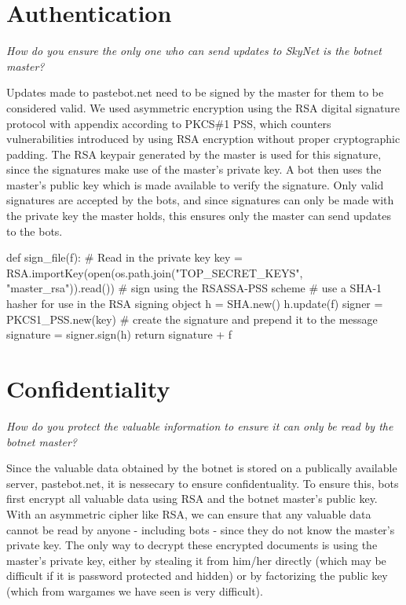 \documentclass[9pt,a4paper]{article}
\begin{document}
\maketitle
\small
\setlength{\parindent}{0pt}

\section{Authentication}
\emph{How do you ensure the only one who can send updates to SkyNet is the botnet master?}

Updates made to pastebot.net need to be signed by the master for them to be considered valid. We used asymmetric encryption using the RSA digital signature protocol with appendix according to PKCS\#1 PSS, which counters vulnerabilities introduced by using RSA encryption without proper cryptographic padding. The RSA keypair generated by the master is used for this signature, since the signatures make use of the master's private key. A bot then uses the master's public key which is made available to verify the signature. Only valid signatures are accepted by the bots, and since signatures can only be made with the private key the master holds, this ensures only the master can send updates to the bots.

\begin{center}
\begin{python}
def sign_file(f):    
    # Read in the private key
    key = RSA.importKey(open(os.path.join("TOP_SECRET_KEYS", "master_rsa")).read())
    # sign using the RSASSA-PSS scheme
    # use a SHA-1 hasher for use in the RSA signing object
    h = SHA.new()
    h.update(f)
    signer = PKCS1_PSS.new(key)
    # create the signature and prepend it to the message
    signature = signer.sign(h)
    return signature + f
\end{python}
\end{center}

\section{Confidentiality}
\emph{How do you protect the valuable information to ensure it can only  be read by the botnet master?}

Since the valuable data obtained by the botnet is stored on a publically available server, pastebot.net, it is nessecary to ensure confidentuality. To ensure this, bots first encrypt all valuable data using RSA and the botnet master's public key. With an asymmetric cipher like RSA, we can ensure that any valuable data cannot be read by anyone - including bots - since they do not know the master's private key. The only way to decrypt these encrypted documents is using the master's private key, either by stealing it from him/her directly (which may be difficult if it is password protected and hidden) or by factorizing the public key (which from wargames we have seen is very difficult).\\
\end{document}
